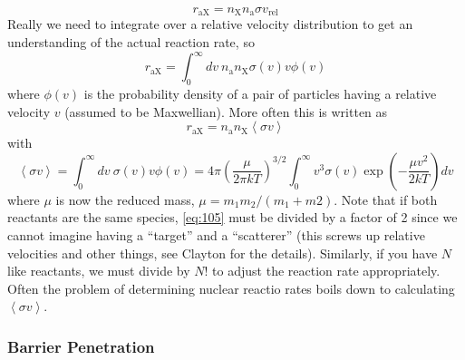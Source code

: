 \documentclass[10pt]{article}
\numberwithin{equation}{section}
\newcommand{\avg}[1]{\left\langle#1\right\rangle}
\begin{document}
  \begin{equation}
    \label{eq:105}
    r_{\mathrm{aX}}=n_\mathrm{X}n_{\mathrm{a}}\sigma v_{\mathrm{rel}}
  \end{equation}
  Really we need to integrate over a relative velocity distribution to
  get an understanding of the actual reaction rate, so
  \begin{equation}
    \label{eq:106}
    r_{\mathrm{aX}}=\int_0^\infty dv\
    n_\mathrm{a}n_{\mathrm{X}}\sigma(v)v\phi(v)
  \end{equation}
  where $\phi(v)$ is the probability density of a pair of particles
  having a relative velocity $v$ (assumed to be Maxwellian). More
  often this is written as
  \begin{equation}
    \label{eq:107}
    r_{\mathrm{aX}}=n_\mathrm{a}n_{\mathrm{X}}\avg{\sigma v}
  \end{equation}
  with
  \begin{equation}
    \label{eq:108}
    \avg{\sigma v}=\int_0^\infty dv\
    \sigma(v)v\phi(v)=4\pi\left(\frac{\mu}{2\pi kT}\right)^{3/2}
    \int_0^\infty v^3\sigma(v)\exp\left(-\frac{\mu v^2}{2kT}\right)dv
  \end{equation}
  where $\mu$ is now the reduced mass, $\mu=m_1m_2/(m_1+m2)$. Note that
  if both reactants are the same species, \eqref{eq:105}
  must be divided by a factor of 2 since we cannot imagine having a
  ``target'' and a ``scatterer'' (this screws up relative velocities
  and other things, see Clayton for the details). Similarly, if you
  have $N$ like reactants, we must divide by $N!$ to adjust the
  reaction rate appropriately. Often the problem of determining
  nuclear reactio rates boils down to calculating $\avg{\sigma v}$.

  \subsubsection{Barrier Penetration}
  \label{sec:barrier-penetration}
\end{document}
